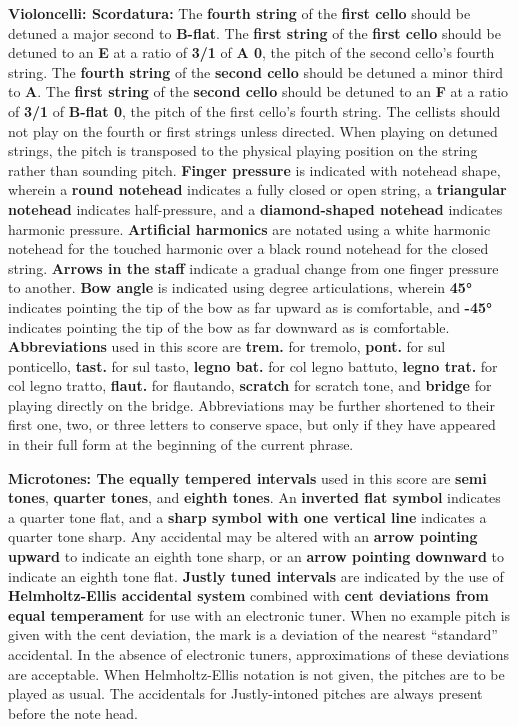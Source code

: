 \documentclass[12pt]{article}
\newcommand*\circled[1]{\tikz[baseline=(char.base)]{
            \node[shape=circle,draw,inner sep=1pt] (char) {#1};}}
\begin{document}
\begingroup
\textbf{Violoncelli: \circled{1} Scordatura:} The \textbf{fourth string} of the \textbf{first cello} should be detuned a major second to \textbf{B-flat}. The \textbf{first string} of the \textbf{first cello} should be detuned to an \textbf{E} at a ratio of \textbf{3/1} of \textbf{A 0}, the pitch of the second cello's fourth string. The \textbf{fourth string} of the \textbf{second cello} should be detuned a minor third to \textbf{A}. The \textbf{first string} of the \textbf{second cello} should be detuned to an \textbf{F} at a ratio of \textbf{3/1} of \textbf{B-flat 0}, the pitch of the first cello's fourth string. The cellists should not play on the fourth or first strings unless directed. When playing on detuned strings, the pitch is transposed to the physical playing position on the string rather than sounding pitch. \textbf{\circled{2} Finger pressure} is indicated with notehead shape, wherein a \textbf{round notehead} indicates a fully closed or open string, a \textbf{triangular notehead} indicates half-pressure, and a \textbf{diamond-shaped notehead} indicates harmonic pressure. \textbf{\circled{3} Artificial harmonics} are notated using a white harmonic notehead for the touched harmonic over a black round notehead for the closed string. \textbf{\circled{4} Arrows in the staff} indicate a gradual change from one finger pressure to another. \textbf{\circled{5} Bow angle} is indicated using degree articulations, wherein \textbf{45°} indicates pointing the tip of the bow as far upward as is comfortable, and \textbf{-45°} indicates pointing the tip of the bow as far downward as is comfortable. \textbf{\circled{6} Abbreviations} used in this score are \textbf{trem.} for tremolo, \textbf{pont.} for sul ponticello, \textbf{tast.} for sul tasto,  \textbf{legno bat.} for col legno battuto, \textbf{legno trat.} for col legno tratto, \textbf{flaut.} for flautando, \textbf{scratch} for scratch tone, and \textbf{bridge} for playing directly on the bridge. Abbreviations may be further shortened to their first one, two, or three letters to conserve space, but only if they have appeared in their full form at the beginning of the current phrase. 
\endgroup

\begingroup
\textbf{Microtones: \circled{1} The equally tempered intervals} used in this score are \textbf{semi tones}, \textbf{quarter tones}, and \textbf{eighth tones}. An \textbf{inverted flat symbol} indicates a quarter tone flat, and a \textbf{sharp symbol with one vertical line} indicates a quarter tone sharp. Any accidental may be altered with an \textbf{arrow pointing upward} to indicate an eighth tone sharp, or an \textbf{arrow pointing downward} to indicate an eighth tone flat. \textbf{\circled{2} Justly tuned intervals} are indicated by the use of \textbf{Helmholtz-Ellis accidental system} combined with \textbf{cent deviations from equal temperament} for use with an electronic tuner. When no example pitch is given with the cent deviation, the mark is a deviation of the nearest “standard” accidental. In the absence of electronic tuners, approximations of these deviations are acceptable. When Helmholtz-Ellis notation is not given, the pitches are to be played as usual. The accidentals for Justly-intoned pitches are always present before the note head.
\endgroup
\end{document}
